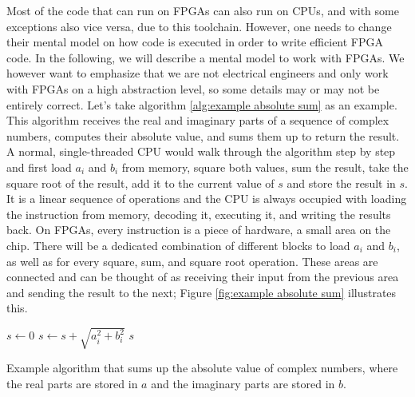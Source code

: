 Most of the code that can run on \acp{FPGA} can also run on \acp{CPU}, and with some exceptions also vice versa, due to this toolchain. However, one needs to change their mental model on how code is executed in order to write efficient \ac{FPGA} code. In the following, we will describe a mental model to work with \acp{FPGA}. We however want to emphasize that we are not electrical engineers and only work with \acp{FPGA} on a high abstraction level, so some details may or may not be entirely correct. Let's take algorithm \ref{alg:example absolute sum} as an example. This algorithm receives the real and imaginary parts of a sequence of complex numbers, computes their absolute value, and sums them up to return the result. A normal, single-threaded \ac{CPU} would walk through the algorithm step by step and first load $a_i$ and $b_i$ from memory, square both values, sum the result, take the square root of the result, add it to the current value of $s$ and store the result in $s$. It is a linear sequence of operations and the \ac{CPU} is always occupied with loading the instruction from memory, decoding it, executing it, and writing the results back. On \acp{FPGA}, every instruction is a piece of hardware, a small area on the chip. There will be a dedicated combination of different blocks to load $a_i$ and $b_i$, as well as for every square, sum, and square root operation. These areas are connected and can be thought of as receiving their input from the previous area and sending the result to the next; Figure \ref{fig:example absolute sum} illustrates this.

\begin{algorithm}
    \begin{algorithmic}
            \State $s \leftarrow 0$
                \State $s \leftarrow s + \sqrt{a_i^2 + b_i^2}$
            \EndFor
            \State \Return $s$
        \EndFunction
    \end{algorithmic}
    \caption{Example algorithm that sums up the absolute value of complex numbers, where the real parts are stored in $a$ and the imaginary parts are stored in $b$.}
    \label{alg:example absolute sum}
\end{algorithm}


